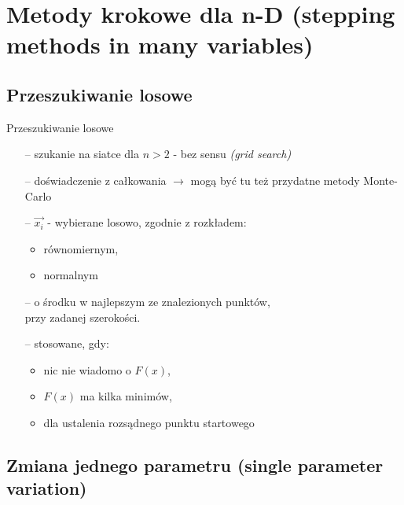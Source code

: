 \section{Metody krokowe dla n-D (stepping methods in many variables)}

\subsection{Przeszukiwanie losowe}

  \begin{frame}{Przeszukiwanie losowe} %

    \begin{block}{}
 	  \begin{itemize} %
 		\item[--] szukanie na siatce dla $n > 2$ - bez sensu \emph{(grid search)} %
 		\item[--] doświadczenie z całkowania $\rightarrow$ mogą być tu też przydatne metody Monte-Carlo %
 	  	\item[--] $\vec{x_i}$ - wybierane losowo, zgodnie z rozkładem: %
 	  	\begin{itemize}
 		  \item równomiernym,
 		  \item normalnym
 	  	\end{itemize}
 	  	\item[--] o środku w najlepszym ze znalezionych punktów,
 	  	\\przy zadanej szerokości.
 	  	\item[--] stosowane, gdy: %
 	  	\begin{itemize}
 		  \item nic nie wiadomo o $F(x)$,
 		  \item $F(x)$ ma kilka minimów,
 		  \item dla ustalenia rozsądnego punktu startowego
 	  	\end{itemize}
 	  \end{itemize}
 	\end{block}

  \end{frame}

\subsection{Zmiana jednego parametru (single parameter variation)}

